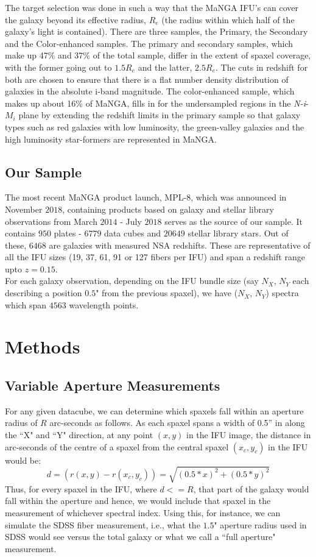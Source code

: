The target selection was done in such a way that the MaNGA IFU's can cover the galaxy beyond its effective radius, $R_{e}$ (the radius within which half of the galaxy's light is contained). There are three samples, the Primary, the Secondary and the Color-enhanced samples. The primary and secondary samples, which make up 47\% and 37\% of the total sample, differ in the extent of spaxel coverage, with the former going out to $1.5R_{e}$ and the latter, $2.5R_{e}$.  The cuts in redshift for both are chosen to ensure that there is a flat number density distribution of galaxies in the absolute i-band magnitude. The color-enhanced sample, which makes up about 16\% of MaNGA, fills in for the undersampled regions in the \emph{N-i}-$M_{i}$ plane by extending the redshift limits in the primary sample so that galaxy types such as red galaxies with low luminosity, the green-valley galaxies and the high luminosity star-formers are represented in MaNGA.\\

\subsection{Our Sample}
The most recent MaNGA product launch, MPL-$8$, which was announced in November $2018$, containing products based on galaxy and stellar library observations from March $2014$ - July $2018$ serves as the source of our sample. It contains $950$ plates - $6779$ data cubes and $20649$ stellar library stars. Out of these, $6468$ are galaxies with measured NSA redshifts. These are representative of all the IFU sizes (19, 37, 61, 91 or 127 fibers per IFU) and span a redshift range upto $z = 0.15$.\\
For each galaxy observation, depending on the IFU bundle size (say $N_{X}$, $N_{Y}$ each describing a position $0.5$" from the previous spaxel), we have ($N_{X}$, $N_{Y}$) spectra which span $4563$ wavelength points. 

\section{Methods}
\label{sec:chap2methods}

\subsection{Variable Aperture Measurements}
For any given datacube, we can determine which spaxels fall within an aperture radius of $R$ arc-seconds as follows. As each spaxel spans a width of 0.5'' in along the ``X" and ``Y" direction, at any point $(x,y)$ in the IFU image, the distance in arc-seconds of the centre of a spaxel from the central spaxel $(x_{c},y_{c})$ in the IFU would be:
$$ d = (r(x,y) - r(x_{c},y_{c})) = \sqrt{(0.5*x)^2 + (0.5*y)^2} $$
Thus, for every spaxel in the IFU, where $d<=R$, that part of the galaxy would fall within the aperture and hence, we would include that spaxel in the measurement of whichever spectral index. Using this, for instance, we can simulate the SDSS fiber measurement, i.e.,  what the $1.5$" aperture radius used in SDSS would see versus the total galaxy or what we call a ``full aperture" measurement.

